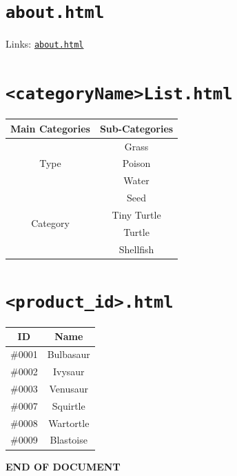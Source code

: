 \documentclass[a4paper,12pt]{article} %
\begin{document}
\section{\texttt{about.html}}
Links: 
\href{../src/about.html}{\texttt{about.html}}


\section{\texttt{<categoryName>List.html}}

\begin{tabular}{|c|c|}
    \hline
    \textbf{Main Categories} & \textbf{Sub-Categories}\\
    \hline
    \multirow{3}{*}{Type} & Grass \\
    \cline{2-2}
    & Poison \\
    \cline{2-2}
    & Water \\
    \hline
    \multirow{4}{*}{Category} & Seed \\
    \cline{2-2}
    & Tiny Turtle \\
    \cline{2-2}
    & Turtle \\
    \cline{2-2}
    & Shellfish \\
    \hline
\end{tabular}


\section{\texttt{<product\_id>.html}} 
\begin{tabular}{|c|c|}
    \hline
    \textbf{ID} & \textbf{Name}\\
    \hline
    \#0001 & Bulbasaur\\
    \hline
    \#0002 & Ivysaur\\
    \hline
    \#0003 & Venusaur\\
    \hline
    \#0007 & Squirtle\\
    \hline
    \#0008 & Wartortle\\
    \hline
    \#0009 & Blastoise\\
    \hline
\end{tabular}






\begin{center}
    \vspace{5em}
    \textbf{END OF DOCUMENT}
\end{center}
\end{document}
